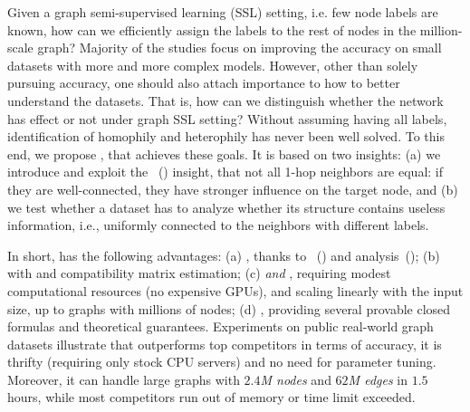 
Given a graph semi-supervised learning (SSL) setting, i.e. few node labels are known, how can we efficiently assign the labels to the rest of nodes in the million-scale graph? Majority of the studies focus on improving the accuracy on small datasets with more and more complex models.
However, other than solely pursuing accuracy, one should also attach importance to how to better understand the datasets. That is, how can we distinguish whether the network has effect or not under graph SSL setting? Without assuming having all labels, identification of homophily and heterophily has never been well solved.
To this end, we propose \method, that achieves these goals.
It is based on two insights:
(a) we introduce and exploit the {\em \ndiff}~(\nd) insight, that not all 1-hop neighbors are equal: if they are well-connected, they have stronger influence on the target node, and
(b) we test whether a dataset has {\em \neteffect} to analyze whether its structure contains useless information, i.e., uniformly connected to the neighbors with different labels.

In short, \method has the following advantages:
(a) {\em \Accurate}, thanks to \ndiff~(\nd) and \neteffect analysis~(\nea);
(b) {\em \explain} with \nea and compatibility matrix estimation;
(c) {\em \thrift \space and \scale}, requiring modest computational resources (no expensive GPUs), and scaling linearly with the input size, up to graphs with millions of nodes;
(d) {\em \theory}, providing several provable closed formulas and theoretical guarantees.
Experiments on public real-world graph datasets illustrate that \method outperforms top competitors in terms of accuracy, it is thrifty (requiring only stock CPU servers) and no need for parameter tuning. Moreover, it can handle large graphs with {\em$2.4$M nodes} and {\em$62$M edges} in $1.5$ hours, while most competitors run out of memory or time limit exceeded.